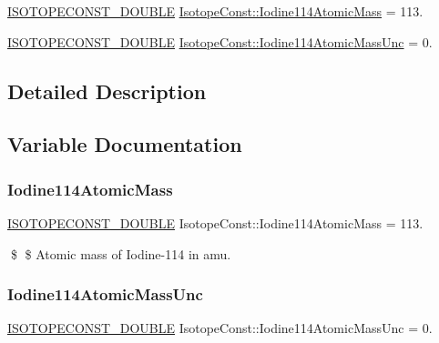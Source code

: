 \begin{DoxyCompactItemize}
\item 
\mbox{\hyperlink{group___isotope_const-_macros_ga8f45a7272ce02c0b4c65c44636ed719a}{I\+S\+O\+T\+O\+P\+E\+C\+O\+N\+S\+T\+\_\+\+D\+O\+U\+B\+LE}} \mbox{\hyperlink{group___isotope_const-_iodine-_i114_ga6331f02eea8981d2e9cfc441a8b5e56f}{Isotope\+Const\+::\+Iodine114\+Atomic\+Mass}} = 113.
\item 
\mbox{\hyperlink{group___isotope_const-_macros_ga8f45a7272ce02c0b4c65c44636ed719a}{I\+S\+O\+T\+O\+P\+E\+C\+O\+N\+S\+T\+\_\+\+D\+O\+U\+B\+LE}} \mbox{\hyperlink{group___isotope_const-_iodine-_i114_ga07196e4aafb9bac73495676806d1766a}{Isotope\+Const\+::\+Iodine114\+Atomic\+Mass\+Unc}} = 0.
\end{DoxyCompactItemize}


\subsection{Detailed Description}


\subsection{Variable Documentation}
\mbox{\label{group___isotope_const-_iodine-_i114_ga6331f02eea8981d2e9cfc441a8b5e56f}} 
\subsubsection{\texorpdfstring{Iodine114\+Atomic\+Mass}{Iodine114AtomicMass}}
{\footnotesize\ttfamily \mbox{\hyperlink{group___isotope_const-_macros_ga8f45a7272ce02c0b4c65c44636ed719a}{I\+S\+O\+T\+O\+P\+E\+C\+O\+N\+S\+T\+\_\+\+D\+O\+U\+B\+LE}} Isotope\+Const\+::\+Iodine114\+Atomic\+Mass = 113.}

\$ \$ Atomic mass of Iodine-\/114 in amu. \mbox{\label{group___isotope_const-_iodine-_i114_ga07196e4aafb9bac73495676806d1766a}} 
\subsubsection{\texorpdfstring{Iodine114\+Atomic\+Mass\+Unc}{Iodine114AtomicMassUnc}}
{\footnotesize\ttfamily \mbox{\hyperlink{group___isotope_const-_macros_ga8f45a7272ce02c0b4c65c44636ed719a}{I\+S\+O\+T\+O\+P\+E\+C\+O\+N\+S\+T\+\_\+\+D\+O\+U\+B\+LE}} Isotope\+Const\+::\+Iodine114\+Atomic\+Mass\+Unc = 0.}

